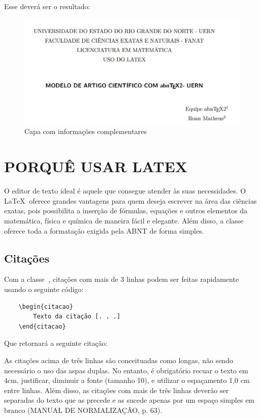 \documentclass[
article,			%
12pt,				%
oneside,			%
a4paper,			%
english,			%
brazil,				%
sumario=tradicional
]{abntex2}
\begin{document}
    Esse deverá ser o resultado:

    \begin{figure}[h!]
        \centering
        \includegraphics[scale=0.5]{Imagem 1.jpg}
        \caption{Capa com informações complementares}
        \label{fig:enter-label}
    \end{figure}

    \section{PORQUÊ USAR LATEX}

    O editor de texto ideal é aquele que consegue atender às suas necessidades. O \LaTeX $~$ oferece grandes vantagens para quem deseja escrever na área das ciências exatas, pois possibilita a inserção de fórmulas, equações e outros elementos da matemática, física e química de maneira fácil e elegante. Além disso, a classe \abnTeX $~$ oferece toda a formatação exigida pela ABNT de forma simples.

    \subsection{Citações}

    Com a classe \abnTeX $~$, citações com mais de 3 linhas podem ser feitas rapidamente usando o seguinte código:

    \begin{verbatim}
    \begin{citacao}
        Texto da citação [. . .]
    \end{citacao}   
    \end{verbatim}

    Que retornará a seguinte citação:

    \begin{citacao}
        As citações acima de três linhas são conceituadas como longas, não sendo necessário o uso das aspas duplas. No entanto, é obrigatório recuar o texto em 4cm, justificar, diminuir a fonte (tamanho 10), e utilizar o espaçamento 1,0 cm entre linhas. Além disso, as citações com mais de três linhas deverão ser separadas do texto que as precede e as sucede apenas por um espaço simples em branco (MANUAL DE NORMALIZAÇÂO, p. 63).
    \end{citacao}
\end{document}
